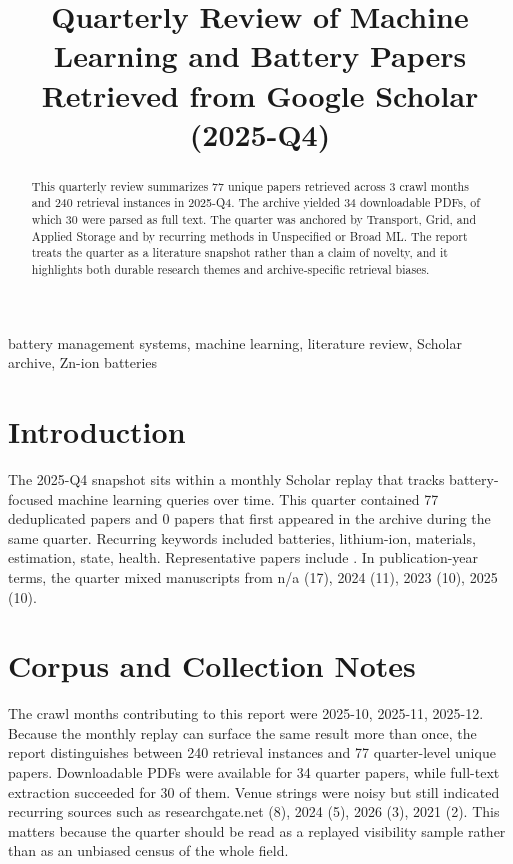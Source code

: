 \documentclass[conference]{IEEEtran}
\begin{document}
\title{ Quarterly Review of Machine Learning and Battery Papers Retrieved from Google Scholar (2025-Q4) }

\author{
}

\maketitle

\begin{abstract}
This quarterly review summarizes 77 unique papers retrieved across 3 crawl months and 240 retrieval instances in 2025-Q4. The archive yielded 34 downloadable PDFs, of which 30 were parsed as full text. The quarter was anchored by Transport, Grid, and Applied Storage and by recurring methods in Unspecified or Broad ML. The report treats the quarter as a literature snapshot rather than a claim of novelty, and it highlights both durable research themes and archive-specific retrieval biases.
\end{abstract}

\begin{IEEEkeywords}
battery management systems, machine learning, literature review, Scholar archive, Zn-ion batteries
\end{IEEEkeywords}

\section{Introduction}
The 2025-Q4 snapshot sits within a monthly Scholar replay that tracks battery-focused machine learning queries over time. This quarter contained 77 deduplicated papers and 0 papers that first appeared in the archive during the same quarter. Recurring keywords included batteries, lithium-ion, materials, estimation, state, health. Representative papers include \cite{stateestimationof2023,textminingfor2022,recentadvancesin2025,section02assessingna}. In publication-year terms, the quarter mixed manuscripts from n/a (17), 2024 (11), 2023 (10), 2025 (10).

\section{Corpus and Collection Notes}
The crawl months contributing to this report were 2025-10, 2025-11, 2025-12. Because the monthly replay can surface the same result more than once, the report distinguishes between 240 retrieval instances and 77 quarter-level unique papers. Downloadable PDFs were available for 34 quarter papers, while full-text extraction succeeded for 30 of them. Venue strings were noisy but still indicated recurring sources such as researchgate.net (8), 2024 (5), 2026 (3), 2021 (2). This matters because the quarter should be read as a replayed visibility sample rather than as an unbiased census of the whole field.
\end{document}
